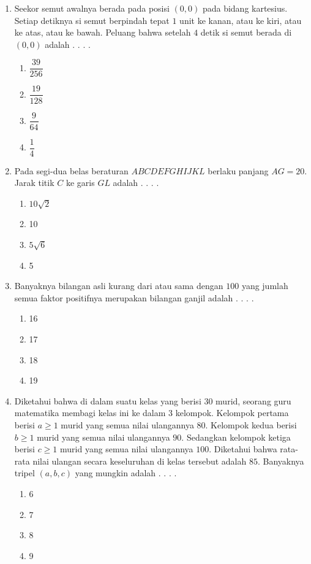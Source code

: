 \documentclass{article}
\begin{document}
\begin{enumerate}
    \item Seekor semut awalnya berada pada posisi $(0, 0)$ pada bidang kartesius. Setiap detiknya si semut berpindah tepat $1$ unit ke kanan, atau ke kiri, atau ke atas, atau ke bawah. Peluang bahwa setelah $4$ detik si semut berada di $(0, 0)$ adalah . . . .
    \begin{enumerate}[label={(\Alph*)}]
        \item $\dfrac{39}{256}$ \item $\dfrac{19}{128}$ \item $\dfrac{9}{64}$ \item $\dfrac{1}{4}$
    \end{enumerate}

    \item Pada segi-dua belas beraturan $ABCDEFGHIJKL$ berlaku panjang $AG=20$. Jarak titik $C$ ke garis $GL$ adalah . . . .
    \begin{enumerate}[label={(\Alph*)}]
        \item $10\sqrt{2}$ \item 10 \item $5\sqrt{6}$ \item 5
    \end{enumerate}

    \item Banyaknya bilangan asli kurang dari atau sama dengan $100$ yang jumlah semua faktor positifnya merupakan bilangan ganjil adalah . . . .
    \begin{enumerate}[label={(\Alph*)}]
        \item 16 \item 17 \item 18 \item 19
    \end{enumerate}

    \item Diketahui bahwa di dalam suatu kelas yang berisi $30$ murid, seorang guru matematika membagi kelas ini ke dalam 3 kelompok. Kelompok pertama berisi $a\ge 1$ murid yang semua nilai ulangannya $80$. Kelompok kedua berisi $b\ge 1$ murid yang semua nilai ulangannya $90$. Sedangkan kelompok ketiga berisi $c\ge 1$ murid yang semua nilai ulangannya $100$. Diketahui bahwa rata-rata nilai ulangan secara keseluruhan di kelas tersebut adalah $85$. Banyaknya tripel $(a,b,c)$ yang mungkin adalah . . . .
    \begin{enumerate}[label={(\Alph*)}]
        \item 6 \item 7 \item 8 \item 9
    \end{enumerate}


\end{enumerate}
\end{document}
